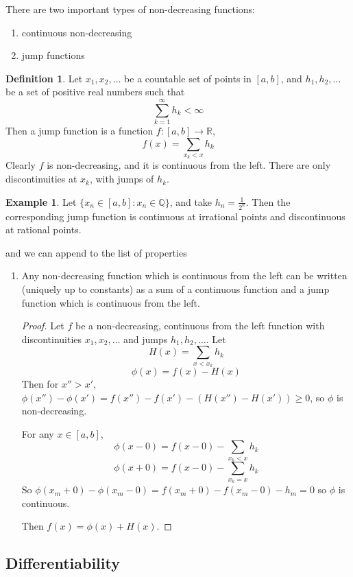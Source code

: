 \documentclass[11pt,a4paper]{report}
\theoremstyle{plain}
\theoremstyle{definition}
\newtheorem*{defn}{Definition}
\newtheorem*{eg}{Example}
\theoremstyle{remark}
\newcommand{\R}{\mathbb{R}}
\newcommand{\Q}{\mathbb{Q}}
\begin{document}
There are two important types of non-decreasing functions:
\begin{enumerate}
  \item continuous non-decreasing
  \item jump functions
\end{enumerate}
    
\begin{defn}
  Let $x_1, x_2, \dots$ be a countable set of points in $[a, b]$, and $h_1, h_2, \dots$ be a set of positive real numbers such that 
  $$ \sum_{k=1}^\infty h_k < \infty $$
  Then a jump function is a function $f : [a, b] \to \R$,
  $$ f(x) = \sum_{x_k < x} h_k $$
  Clearly $f$ is non-decreasing, and it is continuous from the left. There are only discontinuities at $x_k$, with jumps of $h_k$.
\end{defn}

\begin{eg}
  Let $\{ x_n \in [a, b] : x_n \in \Q \}$, and take $h_n = \frac{1}{2^n}$. Then the corresponding jump function is continuous at irrational points and discontinuous at rational points.
\end{eg}

and we can append to the list of properties
\begin{enumerate}
  \item Any non-decreasing function which is continuous from the left can be written (uniquely up to constants) as a sum of a continuous function and a jump function which is continuous from the left.

    \begin{proof}
      Let $f$ be a non-decreasing, continuous from the left function with discontinuities $x_1, x_2, \dots$ and jumps $h_1, h_2, \dots$. Let
      $$ H(x) = \sum_{x < x_k} h_k $$
      $$ \phi(x) = f(x) - H(x) $$
      Then for $x'' > x'$, $\phi(x'') - \phi(x') = f(x'') - f(x') - (H(x'') - H(x')) \ge 0$, so $\phi$ is non-decreasing.

      For any $x \in [a, b]$,
        $$ \phi(x - 0) = f(x - 0) - \sum_{x_k < x} h_k $$
        $$ \phi(x + 0) = f(x - 0) - \sum_{x_k = x} h_k $$
      So $\phi(x_m + 0) - \phi(x_m - 0) = f(x_m + 0) - f(x_m - 0) - h_m = 0$ so $\phi$ is continuous.

      Then $f(x) = \phi(x) + H(x)$.
    \end{proof}
\end{enumerate}


\subsection{Differentiability}
\end{document}
